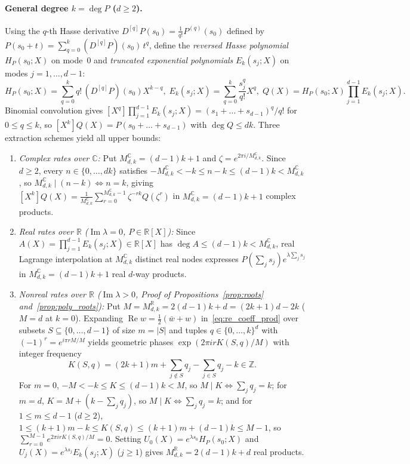\documentclass[11pt,a4paper]{article}
\theoremstyle{plain}
\theoremstyle{definition}
\newcommand{\R}{\mathbb{R}}
\newcommand{\C}{\mathbb{C}}
\DeclareMathOperator{\RePart}{Re}
\DeclareMathOperator{\ImPart}{Im}
\begin{document}
\paragraph{General degree $k = \deg P$ ($d \ge 2$).}
Using the $q$-th Hasse derivative $D^{[q]} P(s_0) = \frac{1}{q!} P^{(q)}(s_0)$ defined by $P(s_0 + t) = \sum_{q=0}^k (D^{[q]} P)(s_0)\, t^q$, define the \emph{reversed Hasse polynomial} $H_P(s_0; X)$ on mode~$0$ and \emph{truncated exponential polynomials} $E_k(s_j; X)$ on modes $j = 1, \dots, d - 1$:
\begin{equation}\label{eq:hasse_prod}
  H_P(s_0; X) = \sum_{q=0}^k q!\,(D^{[q]} P)(s_0) X^{k - q},\;
  E_k(s_j; X) = \sum_{q=0}^k \frac{s_j^q}{q!} X^q,\;
  Q(X) = H_P(s_0; X)\!\prod_{j=1}^{d-1}\! E_k(s_j; X).
\end{equation}
Binomial convolution gives $[X^q]\prod_{j=1}^{d-1} E_k(s_j; X) = (s_1 + \dots + s_{d-1})^q / q!$ for $0 \le q \le k$, so $[X^k]Q(X) = P(s_0 + \dots + s_{d-1})$ with $\deg Q \le d k$. Three extraction schemes yield all upper bounds:
\begin{enumerate}[leftmargin=2em,itemsep=2pt]
  \item \emph{Complex rates over $\C$:} Put $M_{d,k}^{\C} = (d - 1)k + 1$ and $\zeta = e^{2\pi i / M_{d,k}^{\C}}$. Since $d \ge 2$, every $n \in \{0,\dots,dk\}$ satisfies $-M_{d,k}^{\C} < -k \le n - k \le (d - 1)k < M_{d,k}^{\C}$, so $M_{d,k}^{\C} \mid (n - k) \iff n = k$, giving $[X^k]Q(X) = \frac{1}{M_{d,k}^{\C}}\sum_{r=0}^{M_{d,k}^{\C}-1} \zeta^{-rk} Q(\zeta^r)$ in $M_{d,k}^{\C} = (d - 1)k + 1$ complex products.
  \item \emph{Real rates over $\R$ ($\ImPart\lambda = 0$, $P \in \R[X]$):} Since $A(X) = \prod_{j=1}^{d-1} E_k(s_j; X) \in \R[X]$ has $\deg A \le (d - 1)k < M_{d,k}^{\C}$, real Lagrange interpolation at $M_{d,k}^{\C}$ distinct real nodes expresses $P(\sum_j s_j)e^{\lambda\sum_j s_j}$ in $M_{d,k}^{\C} = (d - 1)k + 1$ real $d$-way products.
  \item \emph{Nonreal rates over $\R$ ($\ImPart\lambda > 0$, Proof of Propositions~\ref{prop:roots} and~\ref{prop:poly_roots}):} Put $M = M_{d,k}^{\R} = 2(d - 1)k + d = (2k + 1)d - 2k$ ($M = d$ at $k = 0$). Expanding $\RePart w = \frac{1}{2}(\bar w + w)$ in~\eqref{eq:re_coeff_prod} over subsets $S \subseteq \{0,\dots,d-1\}$ of size $m = |S|$ and tuples $q \in \{0,\dots,k\}^d$ with $(-1)^r = e^{i\pi r M / M}$ yields geometric phases $\exp(2\pi i r K(S, q) / M)$ with integer frequency
  \[
    K(S, q) = (2k + 1)m + \sum_{j \notin S} q_j - \sum_{j \in S} q_j - k \in \mathbb{Z}.
  \]
  For $m = 0$, $-M < -k \le K \le (d-1)k < M$, so $M \mid K \iff \sum_j q_j = k$; for $m = d$, $K = M + (k - \sum_j q_j)$, so $M \mid K \iff \sum_j q_j = k$; and for $1 \le m \le d - 1$ ($d \ge 2$), $1 \le (k + 1)m - k \le K(S, q) \le (k + 1)m + (d - 1)k \le M - 1$, so $\sum_{r=0}^{M-1} e^{2\pi i r K(S,q)/M} = 0$. Setting $U_0(X) = e^{\lambda s_0} H_P(s_0; X)$ and $U_j(X) = e^{\lambda s_j} E_k(s_j; X)$ ($j \ge 1$) gives $M_{d,k}^{\R} = 2(d - 1)k + d$ real products.
\end{enumerate}
\end{document}
